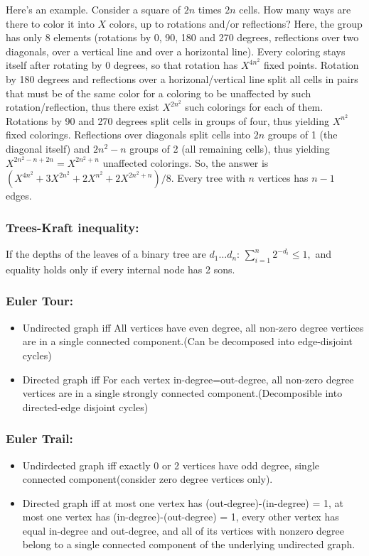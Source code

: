 \documentclass[12pt]{extarticle}
\begin{document}
\begin{multicols*}{2}
			Here's an example. Consider a square of $2n$ times $2n$ cells. How many ways
			are there to color it into $X$ colors, up to rotations and/or reflections?
			Here, the group has only 8 elements (rotations by 0, 90, 180 and 270 degrees,
			reflections over two diagonals, over a vertical line and over a horizontal
			line). Every coloring stays itself after rotating by 0 degrees, so that
			rotation has $X^{4n^2}$ fixed points. Rotation by 180 degrees and reflections
			over a horizonal/vertical line split all cells in pairs that must be of the
			same color for a coloring to be unaffected by such rotation/reflection, thus
			there exist $X^{2n^2}$ such colorings for each of them. Rotations by 90 and 270
			degrees split cells in groups of four, thus yielding $X^{n^2}$ fixed colorings.
			Reflections over diagonals split cells into $2n$ groups of 1 (the diagonal
			itself) and $2n^2-n$ groups of 2 (all remaining cells), thus yielding
			$X^{2n^2-n+2n}=X^{2n^2+n}$ unaffected colorings.  So, the answer is
			$(X^{4n^2}+3X^{2n^2}+2X^{n^2}+2X^{2n^2+n})/8$.
			Every tree with $n$ vertices has $n-1$ edges.
			\par\vskip 2pt
			\subsubsection*{Trees-Kraft inequality:}
			If the depths of the leaves of a binary tree are $d_1 \ldots d_n$:
			$
			\sum_{i=1}^n 2^{- d_i} \leq 1,
			$
			and equality holds only if every internal node has 2 sons.
			\par\vskip 2pt
			\subsubsection*{Euler Tour:}
			\begin{itemize}
			\itemsep0em
			\item Undirected graph iff All vertices have even degree, all non-zero degree vertices are in a single connected component.(Can be decomposed into edge-disjoint cycles)
			\item Directed graph iff For each vertex in-degree=out-degree, all non-zero degree vertices are in a single strongly connected component.(Decomposible into directed-edge disjoint cycles)
			\end{itemize}
			\subsubsection*{Euler Trail:}
			\begin{itemize}
			\itemsep0em 
			\item Undirdected graph iff exactly 0 or 2 vertices have odd degree, single connected component(consider zero degree vertices only).
			\item Directed graph iff at most one vertex has (out-degree)-(in-degree) = 1, at most one vertex has (in-degree)-(out-degree) = 1, every other vertex has equal in-degree and out-degree, and all of its vertices with nonzero degree belong to a single connected component of the underlying undirected graph.
			\end{itemize}


\end{multicols*}
\end{document}
